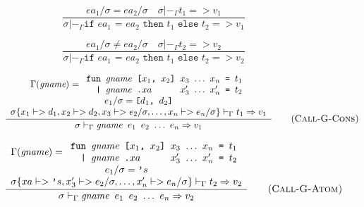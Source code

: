 \documentclass[10pt]{../sigplanconf}
\newcommand{\nfrac}[2]{\frac{\displaystyle{#1}}{\displaystyle{#2}}}
\newcommand{\tagsc}[1]{\tag{\scshape #1}}
\begin{document}
\begin{figure}\centering
  
  \begin{equation}
    \nfrac{
      ea_1/ \sigma = ea_2/\sigma \quad
      \sigma |-_\Gamma t_1 => v_1
    }{
      \sigma |-_\Gamma \texttt{if $ea_1$ = $ea_2$ then $t_1$ else $t_2$} => v_1
    } \tagsc{If-True}
  \end{equation}

\begin{equation}
  \nfrac{
    ea_1/ \sigma \neq ea_2/\sigma \quad
    \sigma |-_\Gamma t_2 => v_2
  }{
    \sigma |-_\Gamma \texttt{if $ea_1$ = $ea_2$ then $t_1$ else $t_2$} => v_2
  } \tagsc{If-False}
\end{equation}

\begin{equation}
  \nfrac{
    \begin{array}{c}
      \Gamma(\textit{gname}) =
      \begin{array}{l}
        \texttt{fun \textit{\rmfamily gname} [$x_1$, $x_2$] $x_3$ $\ldots$ $x_n$ = $t_1$} \\
        \texttt{\ \ | \textit{\rmfamily gname}\ \texttt{.}$xa$ \hspace{.7cm} $x_3'$ $\ldots$ $x_n'$ = $t_2$} \\
      \end{array} \\
      e_1/\sigma = \texttt{[$d_1$, $d_2$]} \\
      \sigma\{x_1 |-> d_1, x_2 |-> d_2, x_3 |-> e_2/\sigma, \ldots, x_n |-> e_n/\sigma\} |-_\Gamma t_1 => v_1
    \end{array}
  }{
    \sigma |-_\Gamma \texttt{\textit{\rmfamily gname} $e_1$ $e_2$ $\ldots$ $e_n$} => v_1
  } \tagsc{Call-G-Cons}
\end{equation}

\begin{equation}
  \nfrac{
    \begin{array}{c}
      \Gamma(\textit{gname}) =
      \begin{array}{l}
        \texttt{fun \textit{\rmfamily gname} [$x_1$, $x_2$] $x_3$ $\ldots$ $x_n$ = $t_1$} \\
        \texttt{\ \ | \textit{\rmfamily gname}\ \texttt{.}$xa$ \hspace{.7cm} $x_3'$ $\ldots$ $x_n'$ = $t_2$} \\
      \end{array} \\
      e_1/\sigma = \texttt{'$s$} \\
      \sigma\{xa |-> \texttt{'}s, x_3' |-> e_2/\sigma, \ldots, x_n' |-> e_n/\sigma\} |-_\Gamma t_2 => v_2
    \end{array}
  }{
    \sigma |-_\Gamma \texttt{\textit{\rmfamily gname} $e_1$ $e_2$ $\ldots$ $e_n$} => v_2
  } \tagsc{Call-G-Atom}
\end{equation}


\end{figure}
\end{document}
